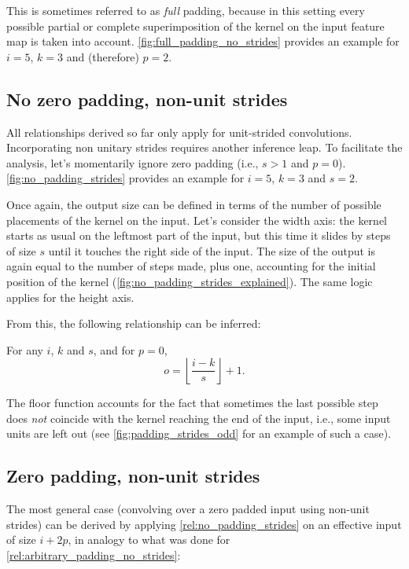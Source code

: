 \noindent This is sometimes referred to as {\em full\/} padding, because in this
setting every possible partial or complete superimposition of the kernel on the
input feature map is taken into account. \autoref{fig:full_padding_no_strides}
provides an example for $i = 5$, $k = 3$ and (therefore) $p = 2$.

\subsection{No zero padding, non-unit strides}

All relationships derived so far only apply for unit-strided convolutions.
Incorporating non unitary strides requires another inference leap. To
facilitate the analysis, let's momentarily ignore zero padding (i.e., $s > 1$
and $p = 0$). \autoref{fig:no_padding_strides} provides an example for $i =
5$, $k = 3$ and $s = 2$.

Once again, the output size can be defined in terms of the number of possible
placements of the kernel on the input. Let's consider the width axis: the
kernel starts as usual on the leftmost part of the input, but this time it
slides by steps of size $s$ until it touches the right side of the input. The
size of the output is again equal to the number of steps made, plus one,
accounting for the initial position of the kernel
(\autoref{fig:no_padding_strides_explained}). The same logic applies for the
height axis.

From this, the following relationship can be inferred:

\begin{relationship}\label{rel:no_padding_strides}
For any $i$, $k$ and $s$, and for $p = 0$,
\begin{equation*}
    o = \left\lfloor \frac{i - k}{s} \right\rfloor + 1.
\end{equation*}
\end{relationship}

\noindent The floor function accounts for the fact that sometimes the last
possible step does {\em not\/} coincide with the kernel reaching the end of the
input, i.e., some input units are left out (see
\autoref{fig:padding_strides_odd} for an example of such a case).

\subsection{Zero padding, non-unit strides}

The most general case (convolving over a zero padded input using non-unit
strides) can be derived by applying \autoref{rel:no_padding_strides} on an
effective input of size $i + 2p$, in analogy to what was done for
\autoref{rel:arbitrary_padding_no_strides}:

